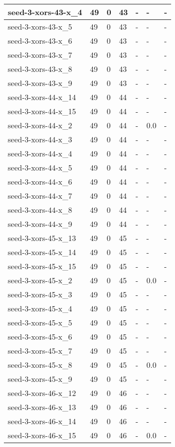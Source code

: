 \begin{scriptsize}
\begin{longtable}{|p{5cm}|l|l|l|l|l|l|}
seed-3-xors-43-x\_4&49&0&43&-&-&- \\ \hline 
seed-3-xors-43-x\_5&49&0&43&-&-&- \\ \hline 
seed-3-xors-43-x\_6&49&0&43&-&-&- \\ \hline 
seed-3-xors-43-x\_7&49&0&43&-&-&- \\ \hline 
seed-3-xors-43-x\_8&49&0&43&-&-&- \\ \hline 
seed-3-xors-43-x\_9&49&0&43&-&-&- \\ \hline 
seed-3-xors-44-x\_14&49&0&44&-&-&- \\ \hline 
seed-3-xors-44-x\_15&49&0&44&-&-&- \\ \hline 
seed-3-xors-44-x\_2&49&0&44&-&0.0&- \\ \hline 
seed-3-xors-44-x\_3&49&0&44&-&-&- \\ \hline 
seed-3-xors-44-x\_4&49&0&44&-&-&- \\ \hline 
seed-3-xors-44-x\_5&49&0&44&-&-&- \\ \hline 
seed-3-xors-44-x\_6&49&0&44&-&-&- \\ \hline 
seed-3-xors-44-x\_7&49&0&44&-&-&- \\ \hline 
seed-3-xors-44-x\_8&49&0&44&-&-&- \\ \hline 
seed-3-xors-44-x\_9&49&0&44&-&-&- \\ \hline 
seed-3-xors-45-x\_13&49&0&45&-&-&- \\ \hline 
seed-3-xors-45-x\_14&49&0&45&-&-&- \\ \hline 
seed-3-xors-45-x\_15&49&0&45&-&-&- \\ \hline 
seed-3-xors-45-x\_2&49&0&45&-&0.0&- \\ \hline 
seed-3-xors-45-x\_3&49&0&45&-&-&- \\ \hline 
seed-3-xors-45-x\_4&49&0&45&-&-&- \\ \hline 
seed-3-xors-45-x\_5&49&0&45&-&-&- \\ \hline 
seed-3-xors-45-x\_6&49&0&45&-&-&- \\ \hline 
seed-3-xors-45-x\_7&49&0&45&-&-&- \\ \hline 
seed-3-xors-45-x\_8&49&0&45&-&0.0&- \\ \hline 
seed-3-xors-45-x\_9&49&0&45&-&-&- \\ \hline 
seed-3-xors-46-x\_12&49&0&46&-&-&- \\ \hline 
seed-3-xors-46-x\_13&49&0&46&-&-&- \\ \hline 
seed-3-xors-46-x\_14&49&0&46&-&-&- \\ \hline 
seed-3-xors-46-x\_15&49&0&46&-&0.0&- \\ \hline 

\end{longtable}
\end{scriptsize}

